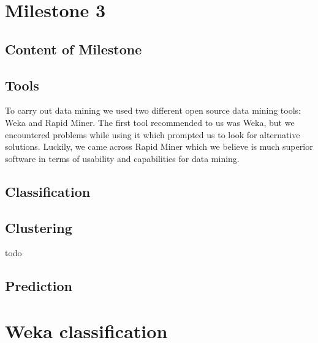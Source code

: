 


\chapter{Milestone 3} \label{cha:ml3}
    \section{Content of Milestone} 
        \label{sec:ml3_content}
    

    \section{Tools} %
    \label{sub:Tools}
    To carry out data mining we used two different open source data mining tools: Weka and Rapid Miner. The first tool recommended to us was Weka, but we encountered problems while using it which prompted us to look for alternative solutions. Luckily, we came across Rapid Miner which we believe is much superior software in terms of usability and capabilities for data mining.
    
    

    \section{Classification} %
    \label{sec:Classification}
    

    \section{Clustering} %
    \label{sub:Clustering}
    todo

    \section{Prediction} %
    \label{sub:Prediction}
    

    \appendix
    \chapter{Weka classification} %
    \label{cha:Weka}
    
    


